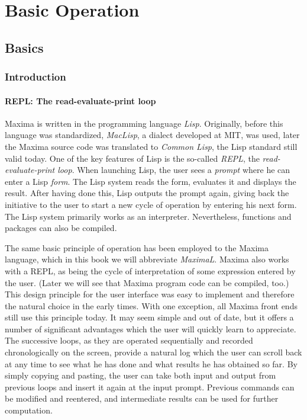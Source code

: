 \documentclass[../Maxima_Workbook.tex]{subfiles}
\begin{document}
\part{Basic Operation}

\chapter{Basics}

\section{Introduction}

\subsection{REPL: The read-evaluate-print loop}

Maxima is written in the programming language \emph{Lisp}. Originally, before this language was standardized, \emph{MacLisp}, a dialect developed at MIT, was used, later the Maxima source code was translated to \emph{Common Lisp},  the Lisp standard still valid today. One of the key features of Lisp is the so-called \emph{REPL}, the \emph{read-evaluate-print loop}. When launching Lisp, the user sees a \emph{prompt} where he can enter a Lisp \emph{form}. The Lisp system reads the form, evaluates it and displays the result. After having done this, Lisp outputs the prompt again, giving back the initiative to the user to start a new cycle of operation by entering his next form. The Lisp system primarily works as an interpreter. Nevertheless, functions and packages can also be compiled.

\lz The same basic principle of operation has been employed to the Maxima language, which in this book we will abbreviate \emph{MaximaL}. Maxima also works with a REPL, as being the cycle of interpretation of some expression entered by the user. (Later we will see that Maxima program code can be compiled, too.) This design principle for the user interface was easy to implement and therefore the natural choice in the early times. With one exception, all Maxima front ends still use this principle today. It may seem simple and out of date, but it offers a number of significant advantages which the user will quickly learn to appreciate. The successive loops, as they are operated sequentially and recorded chronologically on the screen, provide a natural log which the user can scroll back at any time to see what he has done and what results he has obtained so far. By simply copying and pasting, the user can take both input and output from previous loops and insert it again at the input prompt. Previous commands can be modified and reentered, and intermediate results can be used for further computation. 
\end{document}
